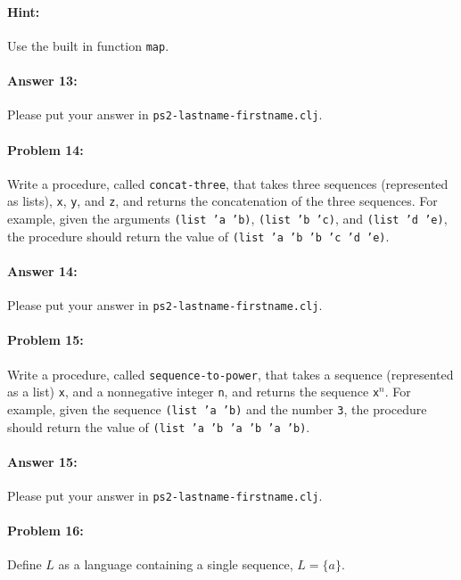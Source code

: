 \documentclass[10pt]{article}
\newcommand{\PSnum}{2}
\begin{document}
\paragraph{Hint:}
  Use the built in function \texttt{map}.

\paragraph{Answer 13:} Please put your answer in \texttt{ps\PSnum-lastname-firstname.clj}.

\noindent\hrulefill %

\paragraph{Problem 14:}
Write a procedure, called \texttt{concat-three}, that takes three
sequences (represented as lists), \texttt{x}, \texttt{y}, and
\texttt{z}, and returns the concatenation of the three sequences. For
example, given the arguments \texttt{(list 'a 'b)}, \texttt{(list 'b
  'c)}, and \texttt{(list 'd 'e)}, the procedure should return the value of
\texttt{(list 'a 'b 'b 'c 'd 'e)}.

\paragraph{Answer 14:} Please put your answer in \texttt{ps\PSnum-lastname-firstname.clj}.

\noindent\hrulefill %

\paragraph{Problem 15:}
Write a procedure, called \texttt{sequence-to-power}, that takes a
sequence (represented as a list) \texttt{x}, and a nonnegative integer
\texttt{n}, and returns the sequence \texttt{x}$^n$. For
example, given the sequence \texttt{(list 'a 'b)} and the number
\texttt{3}, the procedure should return the value of
\texttt{(list 'a 'b 'a 'b 'a 'b)}.

\paragraph{Answer 15:} Please put your answer in
\texttt{ps\PSnum-lastname-firstname.clj}.

\noindent\hrulefill %

\paragraph{Problem 16:}
Define $L$ as a language containing a single sequence,
$L=\{a\}$.
\end{document}

